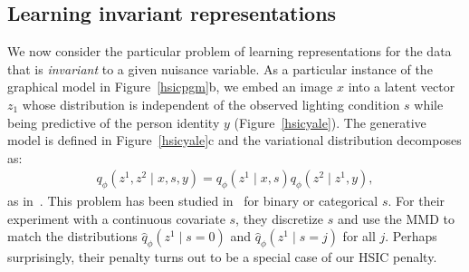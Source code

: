 \subsection{Learning invariant representations}
\label{hsicinvariant}



We now consider the particular problem of learning representations for the data that is \emph{invariant} to a given nuisance variable. As a particular instance of the graphical model in Figure~\ref{hsicpgm}b, we embed an image $x$ into a latent vector $z_1$ whose distribution is independent of the observed lighting condition $s$ while being predictive of the person identity $y$ (Figure~\ref{hsicyale}). The generative model is defined in Figure~\ref{hsicyale}c and the variational distribution decomposes as:
\begin{align}
     q_\phi(z^1, z^2 \mid x, s, y) = q_\phi(z^1 \mid x, s)q_\phi(z^2 \mid z^1, y),
\end{align}
as in~\cite{VFAE}. This problem has been studied in~\cite{VFAE} for binary or categorical $s$. For their experiment with a continuous covariate $s$, they discretize $s$ and use the MMD to match the distributions $\hat{q}_\phi(z^1 \mid s=0)$ and $\hat{q}_\phi(z^1 \mid s=j)$ for all $j$. Perhaps surprisingly, their penalty turns out to be a special case of our HSIC penalty.

